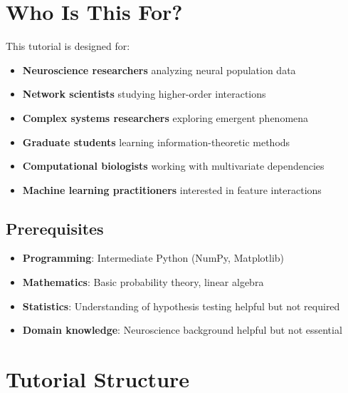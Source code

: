 \documentclass[
  11pt,
  letterpaper,
  oneside,
  openany]{book}
\providecommand{\tightlist}{%
  \setlength{\itemsep}{0pt}\setlength{\parskip}{0pt}}
\begin{document}
\section*{Who Is This For?}\label{who-is-this-for}


This tutorial is designed for:

\begin{itemize}
\tightlist
\item
  \textbf{Neuroscience researchers} analyzing neural population data
\item
  \textbf{Network scientists} studying higher-order interactions
\item
  \textbf{Complex systems researchers} exploring emergent phenomena
\item
  \textbf{Graduate students} learning information-theoretic methods
\item
  \textbf{Computational biologists} working with multivariate
  dependencies
\item
  \textbf{Machine learning practitioners} interested in feature
  interactions
\end{itemize}

\subsection*{Prerequisites}\label{prerequisites}

\begin{itemize}
\tightlist
\item
  \textbf{Programming}: Intermediate Python (NumPy, Matplotlib)
\item
  \textbf{Mathematics}: Basic probability theory, linear algebra
\item
  \textbf{Statistics}: Understanding of hypothesis testing helpful but
  not required
\item
  \textbf{Domain knowledge}: Neuroscience background helpful but not
  essential
\end{itemize}

\section*{Tutorial Structure}\label{tutorial-structure}

\end{document}
